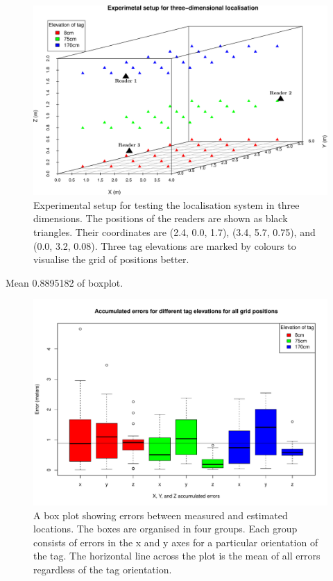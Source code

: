 \begin{figure}[H]
	\begin{center}
		\includegraphics[width=1\textwidth]{figures/grid}
		\caption{Experimental setup for testing the localisation system in three dimensions. The positions of the readers are shown as black triangles. Their coordinates are (2.4, 0.0, 1.7), (3.4, 5.7, 0.75), and (0.0, 3.2, 0.08). Three tag elevations are marked by colours to visualise the grid of positions better.}
		\label{fig:lastgrid}
	\end{center}
\end{figure}

Mean 0.8895182 of boxplot.
\begin{figure}[H]
	\begin{center}
		\includegraphics[width=.8\textwidth]{figures/error_boxplot_3d}
		\caption{A box plot showing errors between measured and estimated locations. The boxes are organised in four groups. Each group consists of errors in the x and y axes for a particular orientation of the tag. The horizontal line across the plot is the mean of all errors regardless of the tag orientation.}
		\label{fig:errorbox3d}
	\end{center}
\end{figure}

